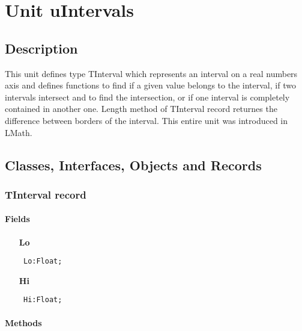 \documentclass[12pt,a4paper,oneside]{report}
\newcommand{\lmath}[1]{   %
	\marginpar{\vspace{#1} 
		\begin{flushright}
			LMath
	\end{flushright} }
}
\newcommand{\declarationitem}[1]{\textbf{#1}}
\newcommand{\code}[1]{\texttt{#1}}
\begin{document}
\section{Unit uIntervals}\lmath{-24pt}
\subsection{Description}
This unit defines type TInterval which represents an interval on a real numbers axis and defines functions to find if a given value belongs to the interval, if two intervals intersect and to find the intersection, or if one interval is completely contained in another one. Length method of TInterval record returnes the difference between borders of the interval. This entire unit was introduced in LMath.
\label{uIntervals}
\subsection{Classes, Interfaces, Objects and Records}
\subsubsection{TInterval record}
\label{uIntervals.TInterval}
\paragraph{Fields}\hspace*{\fill}

\begin{itemize}\label{uIntervals.TInterval-Lo}
\item[\declarationitem{Lo}\hfill]
\begin{flushleft}
\code{
Lo:Float;}

\end{flushleft}


\par  \label{uIntervals.TInterval-Hi}
\item[\declarationitem{Hi}\hfill]
\begin{flushleft}
\code{
Hi:Float;}

\end{flushleft}


\par  \end{itemize}
\paragraph{Methods}\hspace*{\fill}
\end{document}
